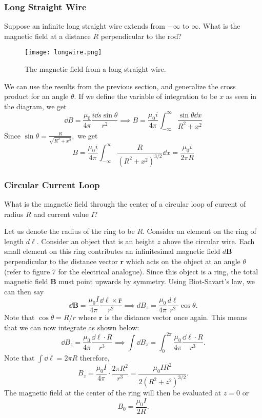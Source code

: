 \documentclass[12pt]{article}
\begin{document}
\subsubsection{Long Straight Wire}
\begin{prob}
Suppose an infinite long straight wire extends from $-\infty$ to $\infty$. What is the magnetic field at a distance $R$ perpendicular to the rod? 
\end{prob}
  \begin{figure}[H]
  \centering
      \texttt{[image: longwire.png]}
      \caption{The magnetic field from a long straight wire.}
  \end{figure}
  We can use the results from the previous section, and generalize the cross product for an angle $\theta$. If we define the variable of integration to be $x$ as seen in the diagram, we get 
  \[\dd B = \frac{\mu_0}{4\pi} \frac{ i \dd s \sin\theta}{r^2}\implies B = \frac{\mu_0 i}{4\pi}\int_{-\infty}^{\infty}\frac{\sin\theta \dd x}{R^2 + x^2} \]
  Since $\sin\theta = \frac{R}{\sqrt{R^2 + x^2}},$ we get 
  \[B = \frac{\mu_0 i}{4\pi}\int_{-\infty}^{\infty} \frac{R}{(R^2 + x^2)^{3/2}} \dd x = \frac{\mu_0 i}{2\pi R}\]
\subsubsection{Circular Current Loop}
\begin{prob}
    What is the magnetic field through the center of a circular loop of current of radius $R$ and current value $I$?
\end{prob}
Let us denote the radius of the ring to be $R$. Consider an element on the ring of length $d\ell$. Consider an object that is an height $z$ above the circular wire. Each small element on this ring contributes an infinitesimal magnetic field $d\mathbf{B}$ perpendicular to the distance vector $\mathbf{r}$ which acts on the object at an angle $\theta$ (refer to figure 7 for the electrical analogue). Since this object is a ring, the total magnetic field $\mathbf{B}$ must point upwards by symmetry. Using Biot-Savart's law, we can then say
\[\dd\mathbf{B} = \frac{\mu_0 I}{4\pi} \frac{\dd\mathbf{\ell} \times \hat{\mathbf{r}}}{r^2}\implies dB_z = \frac{\mu_0}{4\pi}\frac{d\ell}{r^2}\cos\theta.\]Note that $\cos \theta = R/r$ where $\mathbf{r}$ is the distance vector once again. This means that we can now integrate as shown below:
\[\dd B_z = \frac{\mu_0}{4\pi}\frac{\dd \ell\cdot R}{r^3}\implies \int \dd B_z = \int_{0}^{2\pi} \frac{\mu_0}{4\pi}\frac{\dd \ell\cdot R}{r^3}.\]Note that $\int \dd \ell = 2\pi R$ therefore,
\[B_z = \frac{\mu_0 I}{4\pi}\cdot \frac{2\pi R^2}{r^3} = \frac{\mu_0 IR^2}{2(R^2 + z^2)^{3/2}}.\]The magnetic field at the center of the ring will then be evaluated at $z  = 0$ or
\[B_0 = \frac{\mu_0 I}{2R}.\]
\end{document}
